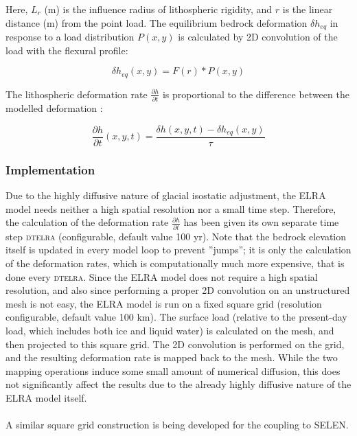 \documentclass{article}
\begin{document}
Here, $L_r$ (m) is the influence radius of lithospheric rigidity, and $r$ is the linear distance (m) from the point load. The equilibrium bedrock deformation $\delta h_{eq}$ in response to a load distribution $P(x,y)$ is calculated by 2D convolution of the load with the flexural profile:

\begin{equation}
\delta h_{eq} (x,y) = F(r) \ast P(x,y)
\end{equation}

The lithospheric deformation rate $\frac{\partial h}{\partial t}$ is proportional to the difference between the modelled deformation :

\begin{equation}
\frac{\partial h}{\partial t} (x,y,t) = \frac{\delta h (x,y,t) - \delta h_{eq} (x,y)}{\tau}
\end{equation}

\subsubsection{Implementation}

Due to the highly diffusive nature of glacial isostatic adjustment, the ELRA model needs neither a high spatial resolution nor a small time step. Therefore, the calculation of the deformation rate $\frac{\partial h}{\partial t}$ has been given its own separate time step \textsc{dt\textunderscore elra} (configurable, default value 100 yr). Note that the bedrock elevation itself is updated in every model loop to prevent ''jumps''; it is only the calculation of the deformation rates, which is computationally much more expensive, that is done every \textsc{dt\textunderscore elra}. Since the ELRA model does not require a high spatial resolution, and also since performing a proper 2D convolution on an unstructured mesh is not easy, the ELRA model is run on a fixed square grid (resolution configurable, default value 100 km). The surface load (relative to the present-day load, which includes both ice and liquid water) is calculated on the mesh, and then projected to this square grid. The 2D convolution is performed on the grid, and the resulting deformation rate is mapped back to the mesh. While the two mapping operations induce some small amount of numerical diffusion, this does not significantly affect the results due to the already highly diffusive nature of the ELRA model itself.\\
\\
A similar square grid construction is being developed for the coupling to SELEN.
\end{document}
